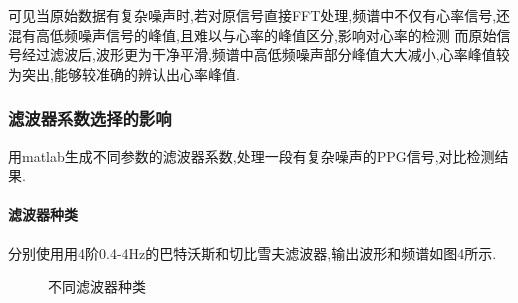 \documentclass[12pt, a4paper, oneside]{ctexart}
\begin{document}
      可见当原始数据有复杂噪声时,若对原信号直接FFT处理,频谱中不仅有心率信号,还混有高低频噪声信号的峰值,且难以与心率的峰值区分,影响对心率的检测
      而原始信号经过滤波后,波形更为干净平滑,频谱中高低频噪声部分峰值大大减小,心率峰值较为突出,能够较准确的辨认出心率峰值.

      \subsubsection{滤波器系数选择的影响}
      用matlab生成不同参数的滤波器系数,处理一段有复杂噪声的PPG信号,对比检测结果.
      \paragraph{滤波器种类}

      分别使用用4阶0.4-4Hz的巴特沃斯和切比雪夫滤波器,输出波形和频谱如图4所示.
      \begin{figure}[H]
        \centering
        \caption{不同滤波器种类}
        \label{fig:twopicture} 
      \end{figure}
\end{document}
